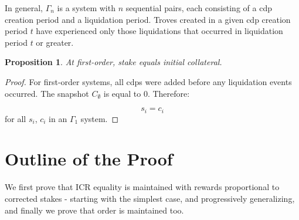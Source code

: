 \documentclass[reqno]{article}
\newtheorem{proposition}[theorem]{Proposition}
\begin{document}
In general, $\Gamma_n$ is a system with $n$ sequential pairs, each consisting of a cdp creation period and a liquidation period. Troves created in a given cdp creation period $t$ have experienced only those liquidations that occurred in liquidation period $t$ or greater.

\begin{proposition}
  At first-order, stake equals initial collateral.
\end{proposition}
\begin{proof}
For first-order systems, all cdps were added before any liquidation events occurred. The snapshot $C_\emptyset$ is equal to 0. Therefore:

\begin{equation}
    s_i=c_i
\end{equation}
for all $s_i$, $c_i$ in an $\Gamma_1$ system.
\end{proof}

\section{Outline of the Proof}

We first prove that ICR equality is maintained with rewards proportional to corrected stakes - starting with the simplest case, and progressively generalizing, and finally we prove that order is maintained too.
\end{document}
